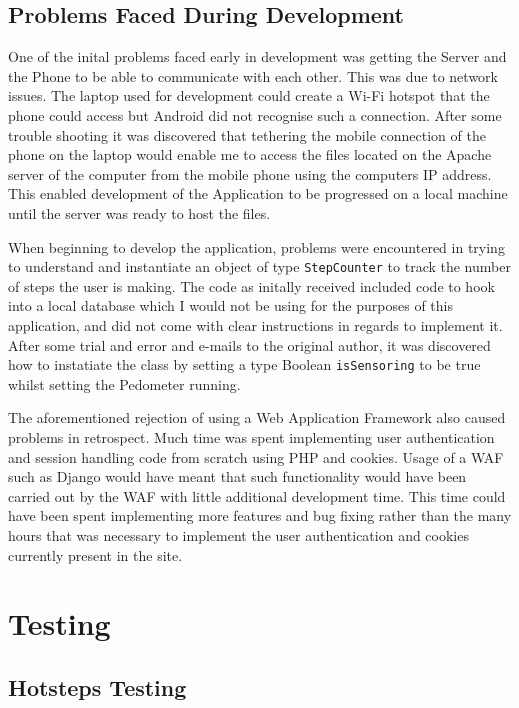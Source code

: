 \documentclass{l4proj}
\begin{document}
\section{Problems Faced During Development}

One of the inital problems faced early in development was getting the Server and the Phone to be able to communicate with each other. This was due to network issues. The laptop used for development could create a Wi-Fi hotspot that the phone could access but Android did not recognise such a connection. After some trouble shooting it was discovered that tethering the mobile connection of the phone on the laptop would enable me to access the files located on the Apache server of the computer from the mobile phone using the computers IP address. This enabled development of the Application to be progressed on a local machine until the server was ready to host the files. 

When beginning to develop the application, problems were encountered in trying to understand and instantiate an object of type \texttt{StepCounter} to track the number of steps the user is making. The code as initally received included code to hook into a local database which I would not be using for the purposes of this application, and did not come with clear instructions in regards to implement it. After some trial and error and e-mails to the original author, it was discovered how to instatiate the class by setting a type Boolean \texttt{isSensoring} to be true whilst setting the Pedometer running.

The aforementioned rejection of using a Web Application Framework also caused problems in retrospect. Much time was spent implementing user authentication and session handling code from scratch using PHP and cookies. Usage of a WAF such as Django would have meant that such functionality would have been carried out by the WAF with little additional development time. This time could have been spent implementing more features and bug fixing rather than the many hours that was necessary to implement the user authentication and cookies currently present in the site.


\chapter{Testing}

\section{Hotsteps Testing}
\end{document}
